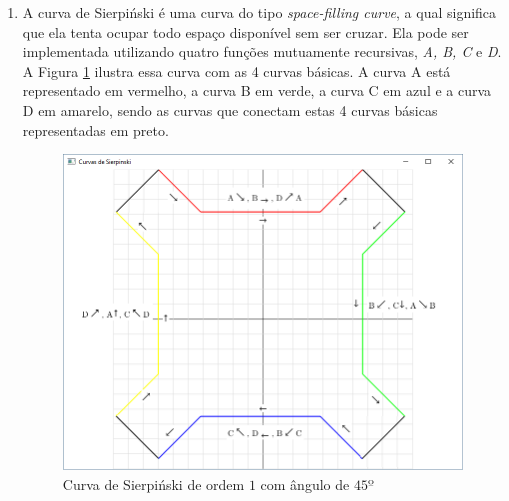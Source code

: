 \begin{enumerate}
  \label{ex:cap04_ex3}

\item
  A curva de Sierpiński é uma curva do tipo \emph{space-filling curve}, a qual significa que ela tenta ocupar todo espaço disponível sem ser cruzar. Ela pode ser implementada utilizando quatro funções mutuamente recursivas, \emph{A, B, C} e \emph{D}. A Figura \ref{fig:cap04_ex16} ilustra essa curva com as 4 curvas básicas. A curva A está representado em vermelho, a curva B em verde, a curva C em azul e a curva D em amarelo, sendo as curvas que conectam estas 4 curvas básicas representadas em preto.

   \begin{figure}[ht]
    \centerline{\includegraphics[width=.5\textwidth]{img/cap4_ex16.png}}
    \caption{Curva de Sierpiński de ordem $1$ com ângulo de $45º$}
    \label{fig:cap04_ex16}
  \end{figure}



\end{enumerate}
